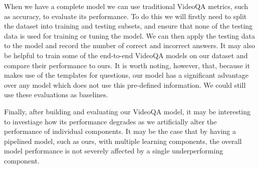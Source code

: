 \documentclass[../interim.tex]{subfiles}
\begin{document}
When we have a complete model we can use traditional VideoQA metrics, such as accuracy, to evaluate its performance. To do this we will firstly need to split the dataset into training and testing subsets, and ensure that none of the testing data is used for training or tuning the model. We can then apply the testing data to the model and record the number of correct and incorrect answers. It may also be helpful to train some of the end-to-end VideoQA models on our dataset and compare their performance to ours. It is worth noting, however, that, because it makes use of the templates for questions, our model has a significant advantage over any model which does not use this pre-defined information. We could still use these evaluations as baselines.

Finally, after building and evaluating our VideoQA model, it may be interesting to investiage how its performance degrades as we artificially alter the performance of individual components. It may be the case that by having a pipelined model, such as ours, with multiple learning components, the overall model performance is not severely affected by a single underperforming component.
\end{document}
